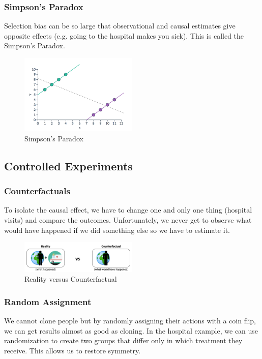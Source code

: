 \subsubsection*{Simpson's Paradox}
Selection bias can be so large that observational and causal estimates give opposite effects (e.g. going to the hospital makes you sick). This is called the Simpson's Paradox.

\begin{figure}[ht]
  \begin{center}
    \includegraphics[width=0.5\textwidth]{figures/simp.png}
    \caption{Simpson's Paradox}
    \label{fig:simp}
  \end{center}
\end{figure}

\subsection*{Controlled Experiments}
\subsubsection*{Counterfactuals}
To isolate the causal effect, we have to change one and only one thing (hospital visits) and compare the outcomes. Unfortunately, we never get to observe what would have happened if we did something else so we have to estimate it.

\begin{figure}[ht]
  \begin{center}
    \includegraphics[width=0.5\textwidth]{figures/counter.png}
    \caption{Reality versus Counterfactual}
    \label{fig:counter}
  \end{center}
\end{figure}

\newpage
\subsubsection*{Random Assignment}
We cannot clone people but by randomly assigning their actions with a coin flip, we can get results almost as good as cloning. In the hospital example, we can use randomization to create two groups that differ only in which treatment they receive. This allows us to restore symmetry.

